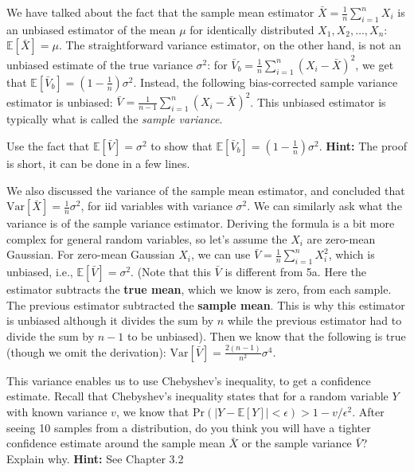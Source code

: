 
We have talked about the fact that the sample mean estimator $\bar{X} = \frac{1}{n} \sum_{i=1}^n X_i$ is an unbiased estimator
of the mean $\mu$ for identically distributed $X_1, X_2, \ldots, X_n$: $\mathbb{E}[\bar{X}] = \mu$. 
The straightforward variance estimator, on the other hand, is not an unbiased estimate of the true variance $\sigma^2$: for $\bar{V}_b = \frac{1}{n} \sum_{i=1}^n (X_i - \bar{X})^2$, we get that $ \mathbb{E}[\bar{V}_b] = (1-\tfrac{1}{n}) \sigma^2$.
Instead, the following bias-corrected sample variance estimator is unbiased: $\bar{V} = \frac{1}{n-1} \sum_{i=1}^n (X_i - \bar{X})^2$. This unbiased estimator is typically what is called the \emph{sample variance}. 

Use the fact that $\mathbb{E}[\bar{V}] =  \sigma^2$ to show that $\mathbb{E}[\bar{V}_b] = (1-\tfrac{1}{n}) \sigma^2$. \textbf{Hint:} The proof is short, it can be done in a few lines. 

We also discussed the variance of the sample mean estimator, and concluded that $\text{Var}[\bar{X}] = \frac{1}{n} \sigma^2$, for iid variables with variance $\sigma^2$. We can similarly ask what the variance is of the sample variance estimator. Deriving the formula is a bit more complex for general random variables, so let's assume the $X_i$ are zero-mean Gaussian. For zero-mean Gaussian $X_i$, we can use $\bar{V} = \frac{1}{n} \sum_{i=1}^n X_i^2$, which is unbiased, i.e., $\mathbb{E}[\bar{V}] = \sigma^2$. (Note that this $\bar{V}$ is different from 5a. Here the estimator subtracts the \textbf{true mean}, which we know is zero, from each sample. The previous estimator subtracted the \textbf{sample mean}. This is why this estimator is unbiased although it divides the sum by $n$ while the previous estimator had to divide the sum by $n-1$ to be unbiased). Then we know that the following is true (though we omit the derivation):
$ \text{Var}[\bar{V}] = \frac{2(n-1)}{n^2} \sigma^4$.

This variance enables us to use Chebyshev's inequality, to get a confidence estimate. Recall that Chebyshev's inequality states that for a random variable $Y$ with known variance $v$, we know that $\text{Pr}(| Y - \mathbb{E}[Y] | < \epsilon  ) > 1 - v/\epsilon^2$. 
After seeing 10 samples from a distribution, do you think you will have a tighter confidence estimate around the sample mean $\bar{X}$ or the sample variance $\bar{V}$? Explain why.
\textbf{Hint:} See Chapter 3.2